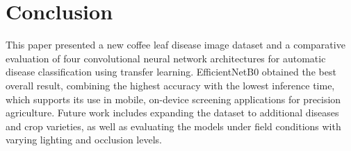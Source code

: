 \documentclass[11pt,a4paper]{article}
\begin{document}
\section{Conclusion}

This paper presented a new coffee leaf disease image dataset and a
comparative evaluation of four convolutional neural network
architectures for automatic disease classification using transfer
learning. EfficientNetB0 obtained the best overall result, combining
the highest accuracy with the lowest inference time, which supports
its use in mobile, on-device screening applications for precision
agriculture. Future work includes expanding the dataset to additional
diseases and crop varieties, as well as evaluating the models under
field conditions with varying lighting and occlusion levels.


\end{document}
